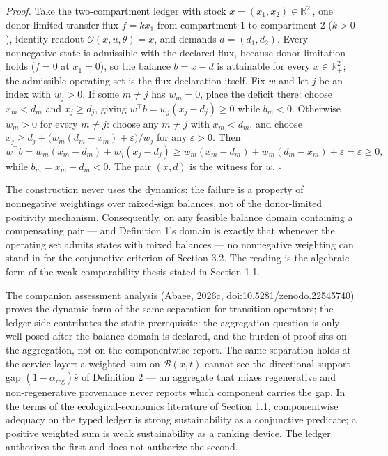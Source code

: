 \documentclass[11pt]{article}
\begin{document}
\emph{Proof.} Take the two-compartment ledger with stock
\(x = (x_1, x_2) \in \mathbb{R}^2_+\), one donor-limited transfer flux
\(f = kx_1\) from compartment 1 to compartment 2 (\(k > 0\)), identity
readout \(\mathcal{O}(x, u, \theta) = x\), and demands
\(d = (d_1, d_2)\). Every nonnegative state is admissible with the
declared flux, because donor limitation holds (\(f = 0\) at
\(x_1 = 0\)), so the balance \(b = x - d\) is attainable for every
\(x \in \mathbb{R}^2_+\); the admissible operating set is the flux
declaration itself. Fix \(w\) and let \(j\) be an index with
\(w_j > 0\). If some \(m \neq j\) has \(w_m = 0\), place the deficit
there: choose \(x_m < d_m\) and \(x_j \ge d_j\), giving
\(w^\top b = w_j (x_j - d_j) \ge 0\) while \(b_m < 0\). Otherwise
\(w_m > 0\) for every \(m \neq j\): choose any \(m \neq j\) with
\(x_m < d_m\), and choose
\(x_j \ge d_j + \bigl( w_m (d_m - x_m) + \varepsilon \bigr)/w_j\) for
any \(\varepsilon > 0\). Then
\[w^\top b = w_m (x_m - d_m) + w_j (x_j - d_j) \ge w_m (x_m - d_m) + w_m (d_m - x_m) + \varepsilon = \varepsilon \ge 0,\]
while \(b_m = x_m - d_m < 0\). The pair \((x, d)\) is the witness for
\(w\). \ensuremath{\square}

The construction never uses the dynamics: the failure is a property of
nonnegative weightings over mixed-sign balances, not of the
donor-limited positivity mechanism. Consequently, on any feasible
balance domain containing a compensating pair --- and Definition 1's
domain is exactly that whenever the operating set admits states with
mixed balances --- no nonnegative weighting can stand in for the
conjunctive criterion of Section 3.2. The reading is the algebraic form
of the weak-comparability thesis stated in Section 1.1.

The companion assessment analysis (Abaee, 2026c, doi:10.5281/\allowbreak{}zenodo.22545740) proves
the dynamic form of the same separation for transition operators; the
ledger side contributes the static prerequisite: the aggregation
question is only well posed after the balance domain is declared, and
the burden of proof sits on the aggregation, not on the componentwise
report. The same separation holds at the service layer: a weighted sum
on \(\mathcal{B}(x,t)\) cannot see the directional support gap
\((1 - \alpha_{\mathrm{reg}})\bar s\) of Definition 2 --- an aggregate
that mixes regenerative and non-regenerative provenance never reports
which component carries the gap. In the terms of the
ecological-economics literature of Section 1.1, componentwise adequacy
on the typed ledger is strong sustainability as a conjunctive predicate;
a positive weighted sum is weak sustainability as a ranking device. The
ledger authorizes the first and does not authorize the second.
\end{document}
